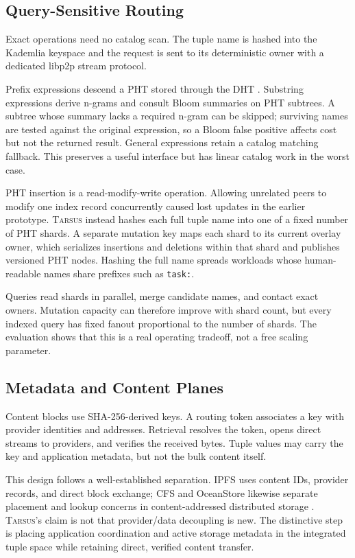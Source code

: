 \documentclass[conference]{IEEEtran}
\newcommand{\system}{\textsc{Tarsus}\xspace}
\begin{document}
\subsection{Query-Sensitive Routing}

Exact operations need no catalog scan. The tuple name is hashed into the
Kademlia keyspace and the request is sent to its deterministic owner with a
dedicated libp2p stream protocol.

Prefix expressions descend a PHT stored through the DHT
\cite{RamabhadranPHT}. Substring expressions derive n-grams and consult Bloom
summaries on PHT subtrees. A subtree whose summary lacks a required n-gram can
be skipped; surviving names are tested against the original expression, so a
Bloom false positive affects cost but not the returned result. General
expressions retain a catalog matching fallback. This preserves a useful
interface but has linear catalog work in the worst case.

PHT insertion is a read-modify-write operation. Allowing unrelated peers to
modify one index record concurrently caused lost updates in the earlier
prototype. \system instead hashes each full tuple name into one of a fixed
number of PHT shards. A separate mutation key maps each shard to its current
overlay owner, which serializes insertions and deletions within that shard and
publishes versioned PHT nodes. Hashing the full name spreads workloads whose
human-readable names share prefixes such as \texttt{task:}.

Queries read shards in parallel, merge candidate names, and contact exact
owners. Mutation capacity can therefore improve with shard count, but every
indexed query has fixed fanout proportional to the number of shards. The
evaluation shows that this is a real operating tradeoff, not a free scaling
parameter.

\subsection{Metadata and Content Planes}

Content blocks use SHA-256-derived keys. A routing token associates a key with
provider identities and addresses. Retrieval resolves the token, opens direct
streams to providers, and verifies the received bytes. Tuple values may carry
the key and application metadata, but not the bulk content itself.

This design follows a well-established separation. IPFS uses content IDs,
provider records, and direct block exchange; CFS and OceanStore likewise
separate placement and lookup concerns in content-addressed distributed
storage \cite{DabekCFS,KubiatowiczOceanStore,Trautwein2022}. \system's claim is
not that provider/data decoupling is new. The distinctive step is placing
application coordination and active storage metadata in the integrated tuple
space while retaining direct, verified content transfer.
\end{document}
